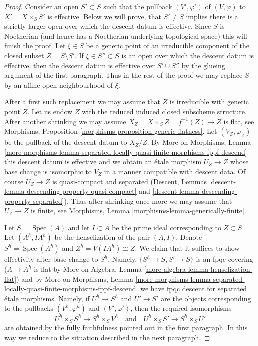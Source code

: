 \documentclass{stacks-project}
\theoremstyle{plain}
\theoremstyle{definition}
\theoremstyle{remark}
\numberwithin{equation}{subsection}
\def\Spec{\mathop{\mathrm{Spec}}}
\begin{document}
\begin{proof}
\medskip\noindent
Consider an open $S' \subset S$ such that the pullback $(V', \varphi')$
of $(V, \varphi)$ to $X' = X \times_S S'$ is effective. Below we will
prove, that $S' \not = S$ implies there is a strictly larger open over
which the descent datum is effective. Since $S$ is Noetherian (and hence
has a Noetherian underlying topological space) this will finish the proof.
Let $\xi \in S$ be a generic point of an irreducible component of the
closed subset $Z = S \setminus S'$.
If $\xi \in S'' \subset S$ is an open over which the descent datum is
effective, then the descent datum is effective over
$S' \cup S''$ by the glueing argument of the first paragraph. Thus
in the rest of the proof we may replace $S$ by an affine open
neighbourhood of $\xi$.

\medskip\noindent
After a first such replacement we may assume that $Z$ is irreducible
with generic point $Z$. Let us endow $Z$ with the reduced induced
closed subscheme structure. After another shrinking we may assume
$X_Z = X \times_S Z = f^{-1}(Z) \to Z$ is flat, see
Morphisms, Proposition \ref{morphisms-proposition-generic-flatness}.
Let $(V_Z, \varphi_Z)$ be the pullback of the descent datum to $X_Z/Z$.
By More on Morphisms, Lemma
\ref{more-morphisms-lemma-separated-locally-quasi-finite-morphisms-fppf-descend}
this descent datum is effective and we obtain an \'etale morphism
$U_Z \to Z$ whose base change is isomorphic to $V_Z$ in a manner
compatible with descent data.
Of course $U_Z \to Z$ is quasi-compact and separated
(Descent, Lemmas \ref{descent-lemma-descending-property-quasi-compact} and
\ref{descent-lemma-descending-property-separated}).
Thus after shrinking once more we may assume
that $U_Z \to Z$ is finite, see
Morphisms, Lemma \ref{morphisms-lemma-generically-finite}.

\medskip\noindent
Let $S = \Spec(A)$ and let $I \subset A$ be the prime ideal corresponding
to $Z \subset S$. Let $(A^h, IA^h)$ be the henselization of the pair
$(A, I)$. Denote $S^h = \Spec(A^h)$ and $Z^h = V(IA^h) \cong Z$.
We claim that it suffices to show effectivity after base change to
$S^h$. Namely, $\{S^h \to S, S' \to S\}$ is an fpqc covering
($A \to A^h$ is flat by More on Algebra, Lemma
\ref{more-algebra-lemma-henselization-flat}) and
by More on Morphisms, Lemma
\ref{more-morphisms-lemma-separated-locally-quasi-finite-morphisms-fppf-descend}
we have fpqc descent for separated \'etale morphisms.
Namely, if $U^h \to S^h$ and $U' \to S'$ are the objects
corresponding to the pullbacks $(V^h, \varphi^h)$ and
$(V', \varphi')$, then the required isomorphisms
$$
U^h \times_S S^h \to S^h \times_S V^h
\quad\text{and}\quad
U^h \times_S S' \to S^h \times_S U'
$$
are obtained by the fully faithfulness pointed out in the first
paragraph. In this way we reduce to the situation described in
the next paragraph.


\end{proof}
\end{document}
